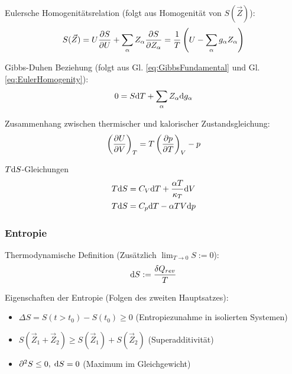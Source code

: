 \documentclass[11pt]{article}
\numberwithin{equation}{section}
\begin{document}
				\noindent
				Eulersche Homogenitätsrelation (folgt aus Homogenität von $S(\vec{Z})$):
				\begin{equation}
					\label{eq:EulerHomogenity}
					S(\vec{Z}) = U\frac{\partial S}{\partial U} + \sum_\alpha Z_\alpha\frac{\partial S}{\partial Z_\alpha}
					= \frac{1}{T} \left( U-\sum_\alpha g_\alpha Z_\alpha \right)
				\end{equation}

				\noindent
				Gibbs-Duhen Beziehung (folgt aus Gl. \ref{eq:GibbsFundamental} und Gl. \ref{eq:EulerHomogenity}):
				\begin{equation}
					0 = S \mathrm{d} T + \sum_\alpha Z_\alpha \mathrm{d} g_\alpha
				\end{equation}

				\noindent
				Zusammenhang zwischen thermischer und kalorischer Zustandsgleichung:
				\begin{equation}
					\left(\frac{\partial U}{\partial V}\right)_T = T\left(\frac{\partial p}{\partial T}\right)_V - p
				\end{equation}

				\noindent
				$T \mathrm{d} S$-Gleichungen
				\begin{equation}
					\begin{aligned}
						T \mathrm{d} S &= C_V \mathrm{d} T + \frac{\alpha T}{\kappa_T} \mathrm{d} V \\
						T \mathrm{d} S &= C_p \mathrm{d} T - \alpha T V \mathrm{d} p
					\end{aligned}
				\end{equation}

			\subsubsection{Entropie}
				\noindent
				Thermodynamische Definition (Zusätzlich $\lim_{T\rightarrow 0} S := 0$):
				\begin{equation}
					\mathrm{d} S := \frac{\delta Q_{rev}}{T}
				\end{equation}

				\noindent
				Eigenschaften der Entropie (Folgen des zweiten Hauptsatzes):
				\begin{itemize}\itemsep -0pt	%
					\item $\Delta S = S(t>t_0)-S(t_0) \ge 0$ \hfill{(Entropiezunahme in isolierten Systemen)}
					\item $S(\vec{Z}_1 + \vec{Z}_2) \ge S(\vec{Z}_1) + S(\vec{Z}_2)$ \hfill{(Superadditivität)}
					\item $\partial^2 S \le 0,\;\mathrm{d} S = 0$ \hfill{(Maximum im Gleichgewicht)}
				\end{itemize}
\end{document}
